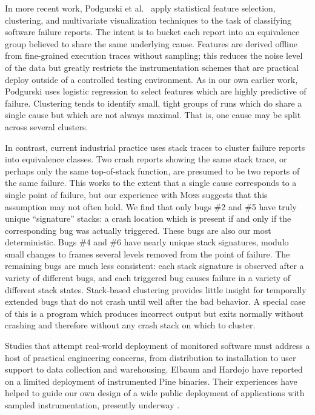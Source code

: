 \documentclass[draft]{sig-alternate}
\newcommand{\moss}{\textsc{Moss}\xspace}
\newcommand{\comment}[1]{}
\begin{document}
In more recent work, Podgurski et al.\ \cite{ICSE`03*465} apply
statistical feature selection, clustering, and multivariate
visualization techniques to the task of classifying software failure
reports.  The intent is to bucket each report into an equivalence
group believed to share the same underlying cause.  Features are
derived offline from fine-grained execution traces without sampling;
this reduces the noise level of the data but greatly restricts the
instrumentation schemes that are practical deploy outside of a
controlled testing environment.  As in our own earlier work, Podgurski
uses logistic regression to select features which are highly
predictive of failure.  \comment{Is it worth noting that we use
different strategies for limiting the size of the set of selected
features?  We use regularized logistic regression whereas Podgurski
applies standard logistic regression to randomly selected subsets of
the complete feature set and keeps the best-performing subset.}
Clustering tends to identify small, tight groups of runs which do
share a single cause but which are not always maximal.  That is, one
cause may be split across several clusters.

In contrast, current
industrial practice uses stack traces to cluster failure reports into
equivalence classes.  Two crash reports showing the same stack trace,
or perhaps only the same top-of-stack function, are presumed to be two
reports of the same failure.  This works to the extent that a single
cause corresponds to a single point of failure, but our experience
with \moss suggests that this assumption may not often hold.  We find
that only bugs \#2 and \#5 have truly unique ``signature'' stacks: a
crash location which is present if and only if the corresponding bug
was actually triggered.  These bugs are also our most deterministic.
Bugs \#4 and \#6 have nearly unique stack signatures, modulo small
changes to frames several levels removed from the point of failure.
The remaining bugs are much less consistent: each stack signature is
observed after a variety of different bugs, and each triggered bug
causes failure in a variety of different stack states.  Stack-based
clustering provides little insight for temporally extended bugs that
do not crash until well after the bad behavior.  A special case of
this is a program which produces incorrect output but exits normally
without crashing and therefore without any crash stack on which to
cluster.

Studies that attempt real-world deployment of monitored software must
address a host of practical engineering concerns, from distribution to
installation to user support to data collection and warehousing.
Elbaum and Hardojo \cite{Elbaum:2003:DISATA} have reported on a
limited deployment of instrumented Pine binaries.  Their experiences
have helped to guide our own design of a wide public deployment of
applications with sampled instrumentation, presently underway
\cite{Liblit:2003:CBIP}.
\end{document}

